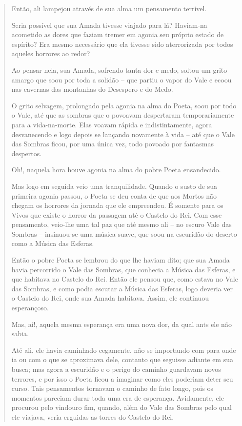 \begin{verse}
Então, ali lampejou através de sua alma um pensamento terrível.

Seria possível que sua Amada tivesse viajado para lá? Haviam-na
acometido as dores que faziam tremer em agonia seu próprio estado de
espírito? Era mesmo necessário que ela tivesse sido aterrorizada por
todos aqueles horrores ao redor?

Ao pensar nela, sua Amada, sofrendo tanta dor e medo, soltou um grito
amargo que soou por toda a solidão -- que partiu o vapor do Vale e ecoou
nas cavernas das montanhas do Desespero e do Medo.

O grito selvagem, prolongado pela agonia na alma do Poeta, soou por todo
o Vale, até que as sombras que o povoavam despertaram temporariamente
para a vida-na-morte. Elas voavam rápida e indistintamente, agora
desvanecendo e logo depois se lançando novamente à vida -- até que o
Vale das Sombras ficou, por uma única vez, todo povoado por fantasmas
despertos.

Oh!, naquela hora houve agonia na alma do pobre Poeta ensandecido.

Mas logo em seguida veio uma tranquilidade. Quando o susto de sua
primeira agonia passou, o Poeta se deu conta de que aos Mortos não
chegam os horrores da jornada que ele empreendeu. É somente para os
Vivos que existe o horror da passagem até o Castelo do Rei. Com esse
pensamento, veio-lhe uma tal paz que até mesmo ali -- no escuro Vale das
Sombras -- insinuou-se uma música suave, que soou na escuridão do
deserto como a Música das Esferas.

Então o pobre Poeta se lembrou do que lhe haviam dito; que sua Amada
havia percorrido o Vale das Sombras, que conhecia a Música das Esferas,
e que habitava no Castelo do Rei. Então ele pensou que, como estava no
Vale das Sombras, e como podia escutar a Música das Esferas, logo
deveria ver o Castelo do Rei, onde sua Amada habitava. Assim, ele
continuou esperançoso.

Mas, ai!, aquela mesma esperança era uma nova dor, da qual ants ele não sabia.

Até ali, ele havia caminhado cegamente, não se importando com para onde
ia ou com o que se aproximava dele, contanto que seguisse adiante em sua
busca; mas agora a escuridão e o perigo do caminho guardavam novos
terrores, e por isso o Poeta ficou a imaginar como eles poderiam deter
seu curso. Tais pensamentos tornavam o caminho de fato longo, pois os
momentos pareciam durar toda uma era de esperança. Avidamente, ele procurou
pelo vindouro fim, quando, além do Vale das Sombras pelo qual ele
viajava, veria erguidas as torres do Castelo do Rei.


\end{verse}

